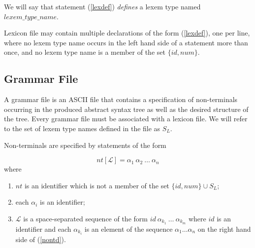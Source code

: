\documentclass[a4paper,10pt]{article}
\begin{document}
We will say that statement (\ref{lexdef}) \textit{defines} a lexem type named $lexem\_type\_name$.

Lexicon file may contain multiple declarations of the form (\ref{lexdef}), one per line, where no lexem type name occurs in the left hand side of a statement more than once, and no lexem type name is a member of the set $\{id, num\}  $.
 
\subsection{Grammar File}\label{gf}
A grammar file is an ASCII file that contains a specification of non-terminals occurring in the produced abstract syntax tree as well as the desired structure of the tree. Every grammar file must be associated with a lexicon file. We will refer to the set of lexem type names defined in the file as $S_L$.  

Non-terminals are specified  by  statements of the form 

\begin{equation}\label{nontd}
nt[\mathcal{L}] = \alpha_1~\alpha_2~\ldots~\alpha_n 
\end{equation}
where 
\begin{enumerate}
\item $nt$ is an identifier which is not a member of the set $\{id,num\}\cup S_L$;
\item each $\alpha_i$  is an identifier;
\item $\mathcal{L}$ is a  space-separated sequence  of the form $id~\alpha_{k_1}~\ldots~\alpha_{k_m}$
where $id$ is an identifier and each  $\alpha_{k_i}$ 
is an element of the sequence   $\alpha_1\ldots \alpha_n$  on the right hand side of (\ref{nontd}).
\end{enumerate}
\end{document}
